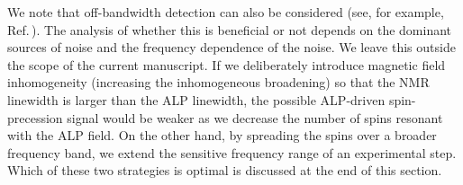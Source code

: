 \documentclass{WileyMSP-template}
\newcommand{\YZ}[1]{\textcolor{purple}{Yuzhe: #1}}
\newcommand{\HB}[1]{\textcolor{orange}{Hendrik: #1}}
\newcommand{\DK}[1]{\textcolor{brown}{Derek: #1}}
\newcommand{\AW}[1]{\textcolor{cyan}{Arne: #1}}
\begin{document}
	We note that off-bandwidth detection can also be considered (see, for example, Ref.\,\cite{Bloch2022NASDUCK_SERF}). The analysis of whether this is beneficial or not depends on the dominant sources of noise and the frequency dependence of the noise. We leave this outside the scope of the current manuscript. 
	If we deliberately introduce magnetic field inhomogeneity (increasing the inhomogeneous broadening) so that the NMR linewidth is larger than the ALP linewidth, the possible ALP-driven spin-precession signal would be weaker as we decrease the number of spins resonant with the ALP field.
	On the other hand, by spreading the spins over a broader frequency band, we extend the sensitive frequency range of an experimental step. 
	Which of these two strategies is optimal is discussed at the end of this section. 

\end{document}
